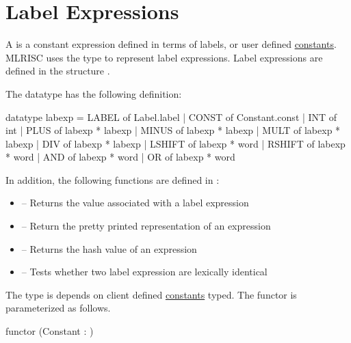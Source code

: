 \section{Label Expressions}

A  is a constant
expression defined in terms of labels, or user 
defined \href{constants.html}{constants}.  MLRISC uses the type
 to represent label expressions.  Label expressions
are defined in the structure 
.

The datatype  has the following definition:
\begin{SML}
  datatype labexp = 
      LABEL of Label.label
    | CONST of Constant.const
    | INT of int
    | PLUS of labexp * labexp
    | MINUS of labexp * labexp
    | MULT of labexp * labexp
    | DIV of labexp * labexp
    | LSHIFT of labexp * word
    | RSHIFT of labexp * word
    | AND of labexp * word
    | OR of labexp * word
\end{SML}

In addition, the following functions are defined in :
\begin{itemize}
  \item {}  -- Returns the value associated with
a label expression
  \item {} -- Return the pretty printed representation of an expression
  \item {} -- Returns the hash value of an expression
  \item {} -- Tests whether two label expression are lexically identical
\end{itemize}

The type  is depends on client defined 
\href{constants.html}{constants} typed.  The functor 
is parameterized as follows.
\begin{SML}
   functor (Constant : )
\end{SML}
